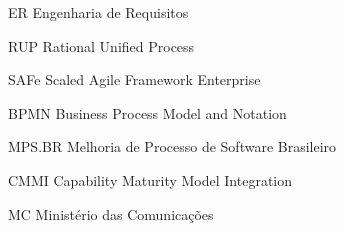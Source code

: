 \begin{siglas}
  \item[ER] Engenharia de Requisitos
  \item[RUP] Rational Unified Process
  \item[SAFe] Scaled Agile Framework Enterprise
  \item[BPMN] Business Process Model and Notation
  \item[MPS.BR] Melhoria de Processo de Software Brasileiro
  \item[CMMI] Capability Maturity Model Integration
  \item[MC] Ministério das Comunicações
\end{siglas}
